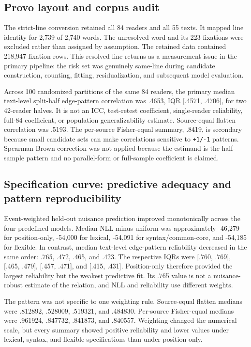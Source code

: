 \documentclass[11pt]{article}
\begin{document}


\subsection{Provo layout and corpus audit}

The strict-line conversion retained all 84 readers and all 55 texts. It mapped line identity for 2,739 of 2,740 words. The unresolved word and its 223 fixations were excluded rather than assigned by assumption. The retained data contained 218,947 fixation rows. This resolved line returns as a measurement issue in the primary pipeline: the risk set was genuinely same-line during candidate construction, counting, fitting, residualization, and subsequent model evaluation.

Across 100 randomized partitions of the same 84 readers, the primary median text-level split-half edge-pattern correlation was .4653, IQR [.4571, .4706], for two 42-reader halves. It is not an ICC, test-retest coefficient, single-reader reliability, full-84 coefficient, or population generalizability estimate. Source-equal flatten correlation was .5193. The per-source Fisher-equal summary, .8419, is secondary because small candidate sets can make correlations sensitive to \texttt{+1/-1} patterns. Spearman-Brown correction was not applied because the estimand is the half-sample pattern and no parallel-form or full-sample coefficient is claimed.

\subsection{Specification curve: predictive adequacy and pattern reproducibility}

Event-weighted held-out nuisance prediction improved monotonically across the four predefined models. Median NLL minus uniform was approximately -46,279 for position-only, -54,000 for lexical, -54,091 for syntax/common-core, and -54,185 for flexible. In contrast, median text-level edge-pattern reliability decreased in the same order: .765, .472, .465, and .423. The respective IQRs were [.760, .769], [.465, .479], [.457, .471], and [.415, .431]. Position-only therefore provided the largest reliability but the weakest predictive fit. Its .765 value is not a nuisance-robust estimate of the relation, and NLL and reliability use different weights.

The pattern was not specific to one weighting rule. Source-equal flatten medians were .812892, .528009, .519321, and .484830. Per-source Fisher-equal medians were .961924, .847732, .841873, and .840557. Weighting changed the numerical scale, but every summary showed positive reliability and lower values under lexical, syntax, and flexible specifications than under position-only.
\end{document}
